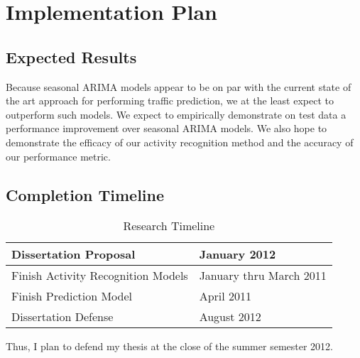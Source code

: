 \chapter{Implementation Plan}
\section{Expected Results}
Because seasonal ARIMA models appear to be on par with the current state of the art approach for performing traffic prediction, we at the least expect to outperform such models.  We expect to empirically demonstrate on test data a performance improvement over seasonal ARIMA models.  We also hope to demonstrate the efficacy of our activity recognition method and the accuracy of our performance metric.

\section{Completion Timeline}
\begin{table}[h]
   \begin{tabular}{|l|l|}
      \hline
      Dissertation Proposal & January 2012 \\
      \hline
      Finish Activity Recognition Models & January thru March 2011  \\
      \hline
      Finish Prediction Model & April 2011 \\
      \hline
      Dissertation Defense & August 2012 \\ 	
      \end{tabular}
      \label{tab:res_timeline}
      \caption{Research Timeline}
\end{table}

Thus, I plan to defend my thesis at the close of the summer semester 2012.